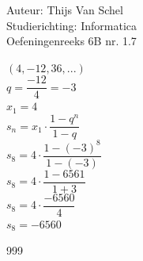 \documentclass[a4paper]{article}
\begin{document}
  
\noindent \large Auteur: Thijs Van Schel\\
\noindent \large Studierichting: Informatica\\
\noindent \large Oefeningenreeks 6B nr. 1.7 \\

\medskip

\normalsize

$(4, -12, 36, ...)$\\

$q = \dfrac{-12}{4} = -3$\\

$x_1 = 4$\\

$s_n = x_1 \cdot \dfrac{1 - q^n}{1 - q}$\\

$s_8 = 4 \cdot \dfrac{1 - (-3)^8}{1 - (-3)}$\\

$s_8 = 4 \cdot \dfrac{1 - 6561}{1 + 3}$\\

$s_8 = 4 \cdot \dfrac{-6560}{4}$\\

$s_8 = -6560$\\

\begin{thebibliography}{999}
\end{thebibliography}
\end{document}
